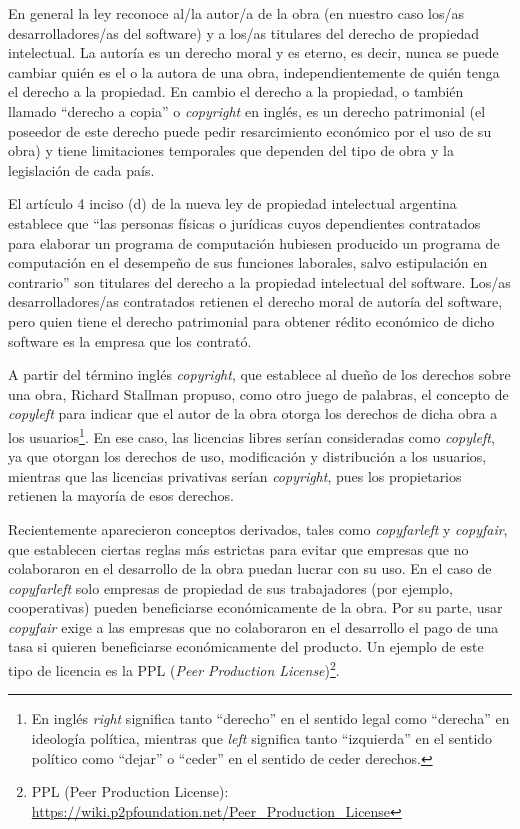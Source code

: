 En general la ley reconoce al/la autor/a de la obra (en nuestro caso los/as desarrolladores/as del software) y a los/as titulares del derecho de propiedad intelectual. La autoría es un derecho moral y es eterno, es decir, nunca se puede cambiar quién es el o la autora de una obra, independientemente de quién tenga el derecho a la propiedad. En cambio el derecho a la propiedad, o también llamado ``derecho a copia'' o \emph{copyright} en inglés, es un derecho patrimonial (el poseedor de este derecho puede pedir resarcimiento económico por el uso de su obra) y tiene limitaciones temporales que dependen del tipo de obra y la legislación de cada país.

El artículo 4 inciso (d) de la nueva ley de propiedad intelectual argentina establece que ``las personas físicas o jurídicas cuyos dependientes contratados para elaborar un programa de computación hubiesen producido un programa de computación en el desempeño de sus funciones laborales, salvo estipulación en contrario'' son titulares del derecho a la propiedad intelectual del software. Los/as desarrolladores/as contratados retienen el derecho moral de autoría del software, pero quien tiene el derecho patrimonial para obtener rédito económico de dicho software es la empresa que los contrató.

A partir del término inglés \emph{copyright}, que establece al dueño de los derechos sobre una obra, Richard Stallman propuso, como otro juego de palabras, el concepto de \emph{copyleft} para indicar que el autor de la obra otorga los derechos de dicha obra a los usuarios\footnote{En inglés \emph{right} significa tanto ``derecho'' en el sentido legal como ``derecha'' en ideología política, mientras que \emph{left} significa tanto ``izquierda'' en el sentido político como ``dejar'' o ``ceder'' en el sentido de ceder derechos.}. En ese caso, las licencias libres serían consideradas como \emph{copyleft}, ya que otorgan los derechos de uso, modificación y distribución a los usuarios, mientras que las licencias privativas serían \emph{copyright}, pues los propietarios retienen la mayoría de esos derechos.

Recientemente aparecieron conceptos derivados, tales como \emph{copyfarleft} y \emph{copyfair}, que establecen ciertas reglas más estrictas para evitar que empresas que no colaboraron en el desarrollo de la obra puedan lucrar con su uso. En el caso de \emph{copyfarleft} solo empresas de propiedad de sus trabajadores (por ejemplo, cooperativas) pueden beneficiarse económicamente de la obra. Por su parte, usar \emph{copyfair} exige a las empresas que no colaboraron en el desarrollo el pago de una tasa si quieren beneficiarse económicamente del producto. Un ejemplo de este tipo de licencia es la PPL (\emph{Peer Production License})\footnote{PPL (Peer Production License): \url{https://wiki.p2pfoundation.net/Peer_Production_License}}.
\\


